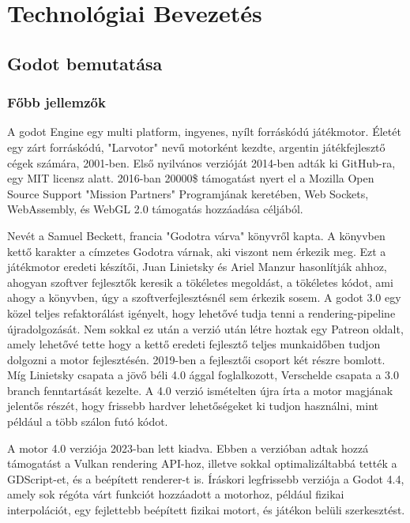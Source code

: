 \documentclass[
]{thesis-ekf}
\theoremstyle{definition}
\theoremstyle{remark}
\begin{document}
	
	\chapter{Technológiai Bevezetés}
	\section{Godot bemutatása}
	\subsection{Főbb jellemzők}
	A godot Engine egy multi platform, ingyenes, nyílt forráskódú játékmotor. Életét egy zárt forráskódú, "Larvotor" nevű motorként kezdte, argentin játékfejlesztő cégek számára, 2001-ben\cite{GodotInImages}.
	Első nyilvános verzióját 2014-ben adták ki GitHub-ra, egy MIT licensz\cite{MITLicense} alatt. 2016-ban 20000\$ támogatást nyert el a Mozilla Open Source Support "Mission Partners" Programjának keretében, Web Sockets, WebAssembly, és WebGL 2.0 támogatás hozzáadása céljából.\cite{MOSS}
	
	Nevét a Samuel Beckett, francia "Godotra várva"\cite{GodotraVarva} könyvről kapta. A könyvben kettő karakter a címzetes Godotra várnak, aki viszont nem érkezik meg. Ezt a játékmotor eredeti készítői, Juan Linietsky és Ariel Manzur hasonlítják ahhoz, ahogyan szoftver fejlesztők keresik a tökéletes megoldást, a tökéletes kódot, ami ahogy a könyvben, úgy a szoftverfejlesztésnél sem érkezik sosem.\cite{GodotInImages}
	A godot 3.0 egy közel teljes refaktorálást igényelt, hogy lehetővé tudja tenni a rendering-pipeline újradolgozását.\cite{Godot3} Nem sokkal ez után a verzió után létre hoztak egy Patreon oldalt, amely lehetővé tette hogy a kettő eredeti fejlesztő teljes munkaidőben tudjon dolgozni a motor fejlesztésén. 2019-ben a fejlesztői csoport két részre bomlott. Míg Linietsky csapata a jövő béli 4.0 ággal foglalkozott, Verschelde csapata a 3.0 branch fenntartását kezelte. A 4.0 verzió ismételten újra írta a motor magjának jelentős részét, hogy frissebb hardver lehetőségeket ki tudjon használni, mint például a több szálon futó kódot.\cite{Godot2022}
	
	A motor 4.0 verziója 2023-ban lett kiadva. Ebben a verzióban adtak hozzá támogatást a Vulkan rendering API-hoz, illetve sokkal optimalizáltabbá tették a GDScript-et, és a beépített renderer-t is.\cite{Godot4}
	Íráskori legfrissebb verziója a Godot 4.4, amely sok régóta várt funkciót hozzáadott a motorhoz, például fizikai interpolációt, egy fejlettebb beépített fizikai motort, és játékon belüli szerkesztést.\cite{Godot44}
	
\end{document}
